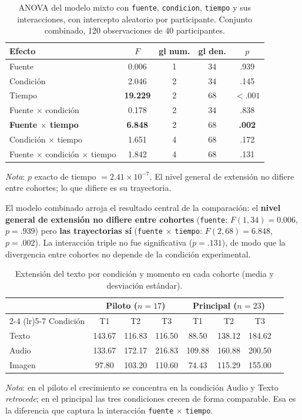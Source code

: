 \documentclass[12pt]{article}
\begin{document}
\begin{table}[htbp]
	\centering
	\caption{ANOVA del modelo mixto con \texttt{fuente}, \texttt{condicion}, \texttt{tiempo} y sus
	interacciones, con intercepto aleatorio por participante. Conjunto combinado, 120
	observaciones de 40 participantes.}
	\label{tab:combinado}
	\begin{tabular}{l c c c c}
		\toprule
		Efecto & $F$ & gl num. & gl den. & $p$ \\
		\midrule
		Fuente                     & 0.006 & 1 & 34 & .939 \\
		Condición                  & 2.046 & 2 & 34 & .145 \\
		Tiempo                     & \textbf{19.229} & 2 & 68 & \textbf{$< .001$} \\
		Fuente $\times$ condición  & 0.178 & 2 & 34 & .838 \\
		\textbf{Fuente $\times$ tiempo} & \textbf{6.848} & 2 & 68 & \textbf{.002} \\
		Condición $\times$ tiempo  & 1.651 & 4 & 68 & .172 \\
		Fuente $\times$ condición $\times$ tiempo & 1.842 & 4 & 68 & .131 \\
		\bottomrule
	\end{tabular}
	\smallskip
	\emph{Nota}: $p$ exacto de tiempo $= 2.41 \times 10^{-7}$. El nivel general de extensión no
	difiere entre cohortes; lo que difiere es su trayectoria.
\end{table}

El modelo combinado arroja el resultado central de la comparación: el \textbf{nivel general de
extensión no difiere entre cohortes} (\texttt{fuente}: $F(1,34) = 0.006$, $p = .939$) pero
\textbf{las trayectorias sí} (\texttt{fuente} $\times$ \texttt{tiempo}: $F(2,68) = 6.848$,
$p = .002$). La interacción triple no fue significativa ($p = .131$), de modo que la divergencia
entre cohortes no depende de la condición experimental.

\begin{table}[htbp]
	\centering
	\caption{Extensión del texto por condición y momento en cada cohorte (media y desviación
	estándar).}
	\label{tab:cohortes_lado_a_lado}
	\begin{tabular}{l c c c c c c c}
		\toprule
		& \multicolumn{3}{c}{\textbf{Piloto} ($n = 17$)} & \multicolumn{3}{c}{\textbf{Principal} ($n = 23$)} & \\
		\cmidrule(lr){2-4} \cmidrule(lr){5-7}
		Condición & T1 & T2 & T3 & T1 & T2 & T3 & \\
		\midrule
		Texto  & 143.67 & 116.83 & 116.50 &  88.50 & 138.12 & 184.62 & \\
		Audio  & 133.67 & 172.17 & 216.83 & 109.88 & 160.88 & 200.50 & \\
		Imagen &  97.80 & 103.20 & 110.60 &  74.43 & 115.29 & 155.00 & \\
		\bottomrule
	\end{tabular}
	\smallskip
	\emph{Nota}: en el piloto el crecimiento se concentra en la condición Audio y Texto
	\emph{retrocede}; en el principal las tres condiciones crecen de forma comparable. Esa es la
	diferencia que captura la interacción \texttt{fuente} $\times$ \texttt{tiempo}.
\end{table}
\end{document}

